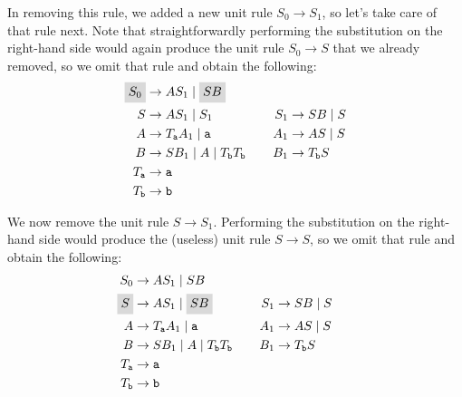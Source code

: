 \begin{example}
\begin{enumerate}
In removing this rule, we added a new unit rule $S_{0} \rightarrow S_{1}$, so let's take care of that rule next. Note that straightforwardly performing the substitution on the right-hand side would again produce the unit rule $S_{0} \rightarrow S$ that we already removed, so we omit that rule and obtain the following:
\begin{equation*}
\begin{aligned}[t]
\highlightmath{S_{0}}			&\rightarrow AS_{1} \mid \highlightmath{SB} \\
S						&\rightarrow AS_{1} \mid S_{1} \\
A						&\rightarrow T_{\texttt{a}}A_{1} \mid \texttt{a} \\
B						&\rightarrow SB_{1} \mid A \mid T_{\texttt{b}}T_{\texttt{b}} \\
T_{\texttt{a}}				&\rightarrow \texttt{a} \\
T_{\texttt{b}}				&\rightarrow \texttt{b}
\end{aligned}
\hspace{0.75cm}
\begin{aligned}[t]
\phantom{S_{0}} & \phantom{\highlightmath{S_{0}}} \\
S_{1}					&\rightarrow SB \mid S \\
A_{1}					&\rightarrow AS \mid S \\
B_{1}					&\rightarrow T_{\texttt{b}}S
\end{aligned}
\end{equation*}

We now remove the unit rule $S \rightarrow S_{1}$. Performing the substitution on the right-hand side would produce the (useless) unit rule $S \rightarrow S$, so we omit that rule and obtain the following:
\begin{equation*}
\begin{aligned}[t]
S_{0}					&\rightarrow AS_{1} \mid SB \\
\highlightmath{S}			&\rightarrow AS_{1} \mid \highlightmath{SB} \\
A						&\rightarrow T_{\texttt{a}}A_{1} \mid \texttt{a} \\
B						&\rightarrow SB_{1} \mid A \mid T_{\texttt{b}}T_{\texttt{b}} \\
T_{\texttt{a}}				&\rightarrow \texttt{a} \\
T_{\texttt{b}}				&\rightarrow \texttt{b}
\end{aligned}
\hspace{0.75cm}
\begin{aligned}[t]
\phantom{S_{0}} & \\
S_{1}					&\rightarrow SB \mid S \phantom{\highlightmath{S_{0}}} \\
A_{1}					&\rightarrow AS \mid S \\
B_{1}					&\rightarrow T_{\texttt{b}}S
\end{aligned}
\end{equation*}


\end{enumerate}
\end{example}
